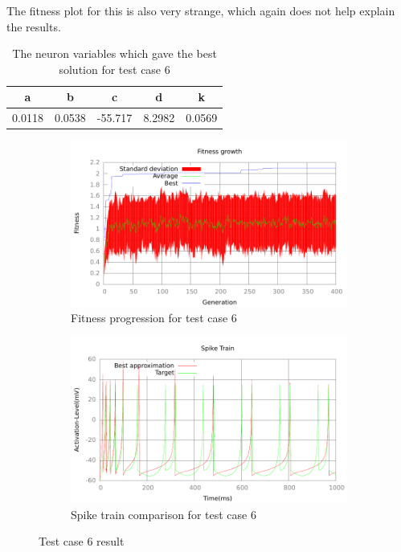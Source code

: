 The fitness plot for this is also very strange, which again does not help
explain the results.
\begin{table}
	\begin{tabular}{c c c c c}
		a & b & c & d & k \\
		\hline
		0.0118 & 0.0538 & -55.717 & 8.2982 & 0.0569
	\end{tabular}
	\caption{The neuron variables which gave the best solution for test case
	6}
\end{table}
\begin{figure}[h]
	\centering
	\begin{subfigure}[b]{0.5\textwidth}
		\includegraphics[width=\textwidth]{../output/wdm_izzy_2_fitness.pdf}
		\caption{Fitness progression for test case 6}
		\label{fig:fitness-test-case-6}
	\end{subfigure}%
	\begin{subfigure}[b]{0.5\textwidth}
		\includegraphics[width=\textwidth]{../output/wdm_izzy_2_spike.pdf}
		\caption{Spike train comparison for test case 6}
		\label{fig:spike-test-case-6}
	\end{subfigure}
	\caption{Test case 6 result}
\end{figure}

